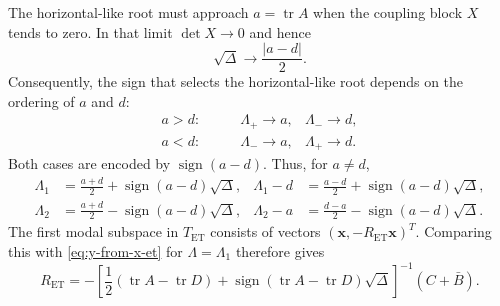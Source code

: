 \documentclass[11pt,a4paper]{article}
\newcommand{\Tr}{\operatorname{tr}}
\newcommand{\mat}[1]{\bm{#1}}
\begin{document}
The horizontal-like root must approach $a=\Tr A$ when the coupling block
$X$ tends to zero.  In that limit $\det X\to0$ and hence
\begin{equation}
 \sqrt{\Delta}\longrightarrow\frac{|a-d|}{2}.
 \label{eq:et-uncoupled-discriminant}
\end{equation}
Consequently, the sign that selects the horizontal-like root depends on
the ordering of $a$ and $d$:
\begin{equation}
 \begin{aligned}
  a>d:&\qquad \Lambda_+\longrightarrow a,
                    &\Lambda_-\longrightarrow d,\\
  a<d:&\qquad \Lambda_-\longrightarrow a,
                    &\Lambda_+\longrightarrow d.
 \end{aligned}
 \label{eq:et-uncoupled-root-selection}
\end{equation}
Both cases are encoded by $\operatorname{sign}(a-d)$.  Thus, for $a\ne d$,
\begin{equation}
 \begin{aligned}
  \Lambda_1
  &=\frac{a+d}{2}
    +\operatorname{sign}(a-d)\sqrt{\Delta},
  &\Lambda_1-d
  &=\frac{a-d}{2}
    +\operatorname{sign}(a-d)\sqrt{\Delta},\\
  \Lambda_2
  &=\frac{a+d}{2}
    -\operatorname{sign}(a-d)\sqrt{\Delta},
  &\Lambda_2-a
  &=\frac{d-a}{2}
    -\operatorname{sign}(a-d)\sqrt{\Delta}.
 \end{aligned}
 \label{eq:horizontal-et-root}
\end{equation}
The first modal subspace in $T_{\mathrm{ET}}$ consists of vectors
$(\mat x,-R_{\mathrm{ET}}\mat x)^T$.  Comparing this with
\cref{eq:y-from-x-et} for $\Lambda=\Lambda_1$ therefore gives
\begin{equation}
 \boxed{
 R_{\mathrm{ET}}
 =-\left[
  \frac12\left(\Tr A-\Tr D\right)
  +\operatorname{sign}\!\left(\Tr A-\Tr D\right)\sqrt{\Delta}
 \right]^{-1}
 \left(C+\bar B\right).
 }
 \label{eq:ret-from-map-blocks}
\end{equation}
\end{document}
